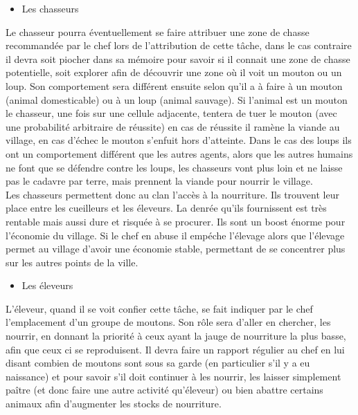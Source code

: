 \documentclass[12pt]{article}
\begin{document}
\begin{itemize}
		\begin{itemize}
		\item Les chasseurs\\
		\end{itemize}

Le chasseur pourra éventuellement se faire attribuer une zone de chasse 
recommandée par le chef lors de l'attribution de cette tâche, dans le cas 
contraire il devra soit piocher dans sa mémoire pour savoir si il connait 
une zone de chasse potentielle, soit explorer afin de découvrir une zone 
où il voit un mouton ou un loup. Son comportement sera différent ensuite selon 
qu'il a à faire à un mouton (animal domesticable) ou à un loup (animal sauvage).
Si l'animal est un mouton le chasseur, une fois sur une cellule adjacente,
tentera de tuer le mouton (avec une probabilité arbitraire de réussite) en 
cas de réussite il ramène la viande au village, en cas d'échec le mouton 
s'enfuit hors d'atteinte. Dans le cas des loups ils ont un comportement 
différent que les autres agents, alors que les autres humains ne font que se 
défendre contre les loups, les chasseurs vont plus loin et ne laisse pas le 
cadavre par terre, mais prennent la viande pour nourrir le village.\\

Les chasseurs permettent donc au clan l'accès à la nourriture. Ils trouvent leur
place entre les cueilleurs et les éleveurs. La denrée qu'ils fournissent est 
très rentable mais aussi dure et risquée à se procurer. Ils sont un boost 
énorme pour l'économie du village. Si le chef en abuse il empéche l'élevage 
alors que l'élevage permet au village d'avoir une économie stable, permettant 
de se concentrer plus sur les autres points de la ville.\\

		\begin{itemize}
		\item Les éleveurs\\
		\end{itemize}

L'éleveur, quand il se voit confier cette tâche, se fait indiquer par le chef 
l'emplacement d'un groupe de moutons. Son rôle sera d'aller en chercher, les 
nourrir, en donnant la priorité à ceux ayant la jauge de nourriture la plus 
basse, afin que ceux ci se reproduisent. Il devra faire un rapport régulier au 
chef en lui disant combien de moutons sont sous sa garde (en particulier s'il 
y a eu naissance) et pour savoir s'il doit continuer à les nourrir, les laisser 
simplement paître (et donc faire une autre activité qu'éleveur) ou bien abattre 
certains animaux afin d'augmenter les stocks de nourriture.\\


\end{itemize}
\end{document}

